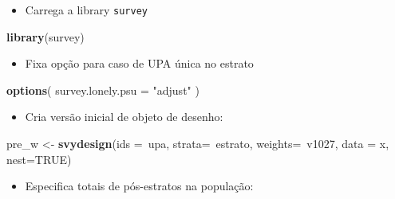 \documentclass[]{book}
\newenvironment{Shaded}{\begin{snugshade}}{\end{snugshade}}
\newcommand{\KeywordTok}[1]{\textcolor[rgb]{0.13,0.29,0.53}{\textbf{{#1}}}}
\newcommand{\DataTypeTok}[1]{\textcolor[rgb]{0.13,0.29,0.53}{{#1}}}
\newcommand{\StringTok}[1]{\textcolor[rgb]{0.31,0.60,0.02}{{#1}}}
\newcommand{\OtherTok}[1]{\textcolor[rgb]{0.56,0.35,0.01}{{#1}}}
\newcommand{\NormalTok}[1]{{#1}}
\providecommand{\tightlist}{%
  \setlength{\itemsep}{0pt}\setlength{\parskip}{0pt}}
\numberwithin{example}{chapter}
\numberwithin{remark}{chapter}
\numberwithin{definition}{chapter}
\begin{document}
\begin{itemize}
\tightlist
\item
  Carrega a library \texttt{survey}
\end{itemize}

\begin{Shaded}
\begin{Highlighting}[]
\KeywordTok{library}\NormalTok{(survey)}
\end{Highlighting}
\end{Shaded}

\begin{itemize}
\tightlist
\item
  Fixa opção para caso de UPA única no estrato
\end{itemize}

\begin{Shaded}
\begin{Highlighting}[]
\KeywordTok{options}\NormalTok{( }\DataTypeTok{survey.lonely.psu =} \StringTok{"adjust"} \NormalTok{)}
\end{Highlighting}
\end{Shaded}

\begin{itemize}
\tightlist
\item
  Cria versão inicial de objeto de desenho:
\end{itemize}

\begin{Shaded}
\begin{Highlighting}[]
\NormalTok{pre_w <-}\StringTok{ }\KeywordTok{svydesign}\NormalTok{(}\DataTypeTok{ids =}\NormalTok{~upa, }\DataTypeTok{strata=}\NormalTok{~estrato, }
  \DataTypeTok{weights=}\NormalTok{~v1027, }\DataTypeTok{data =} \NormalTok{x, }\DataTypeTok{nest=}\OtherTok{TRUE}\NormalTok{)}
\end{Highlighting}
\end{Shaded}

\begin{itemize}
\tightlist
\item
  Especifica totais de pós-estratos na população:
\end{itemize}

\begin{Shaded}
\end{Shaded}
\end{document}
